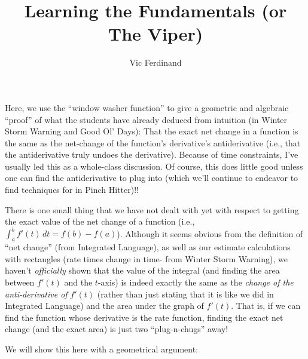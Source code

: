 \documentclass{ximera}
\author{Vic Ferdinand}
\title{Learning the Fundamentals (or The Viper)}
\begin{document}
\begin{abstract}
\end{abstract}
\maketitle

\begin{instructorIntro}
Here, we use the ``window washer function'' to give a geometric and algebraic ``proof'' of what the students have already deduced from intuition (in Winter Storm Warning and Good Ol' Days):  That the exact net change in a function is the same as the net-change of the function's derivative's antiderivative (i.e., that the antiderivative truly undoes the derivative).  Because of time constraints, I've usually led this as a whole-class discussion.  Of course, this does little good unless one can find the antiderivative to plug into (which we'll continue to endeavor to find techniques for in Pinch Hitter)!!
\end{instructorIntro}

There is one small thing that we have not dealt with yet with respect to getting the exact value of the net change of a function (i.e.,  $\int_a^b f'(t)\, dt = f(b) - f(a)$).  Although it seems obvious from the definition of ``net change'' (from Integrated Language), as well as our estimate calculations with rectangles (rate times change in time- from Winter Storm Warning), we haven't {\em officially} shown that the value of the integral (and finding the area between $f'(t)$  and the $t$-axis) is indeed exactly the same as the {\em change of the anti-derivative of} $f'(t)$ (rather than just stating that it is like we did in Integrated Language) and the area under the graph of $f'(t)$.  That is, if we can find the function whose derivative is the rate function, finding the exact net change (and the exact area) is just two ``plug-n-chugs'' away!

    We will show this here with a geometrical argument:
 
 \begin{image}
 \end{image}
 
\end{document}

